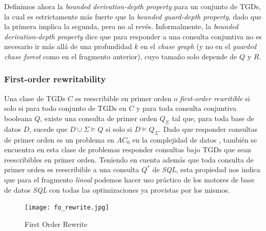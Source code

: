\documentclass[11pt,a4paper,twoside]{tesis}
\begin{document}
Definimos ahora la \textit{bounded derivation-depth property} para un conjunto de TGDs, la cual es estrictamente más fuerte que la \textit{ bounded guard-depth property}, dado que la primera implica la segunda, pero no al revés. Informalmente, la \textit{bounded derivation-depth property} dice que para responder a una consulta conjuntiva no es necesario ir más allá de una profundidad $k$ en el \textit{chase graph} (y no en el \textit{guarded chase forest} como en el fragmento anterior), cuyo tamaño solo depende de $Q$ y $R$.

\subsubsection{First-order rewritability}
Una clase de TGDs $C$ es reescribible en primer orden o \textit{first-order rewritible} si solo si para todo conjunto de TGDs en $C$ y para toda consulta conjuntiva booleana $Q$, existe una consulta de primer orden $Q_\Sigma$ tal que, para toda base de datos $D$, sucede que $D \cup \Sigma \models Q$ si solo si $D \models Q_\Sigma$. Dado que responder consultas de primer orden es un problema en $AC_0$ en la complejidad de datos \cite{Vardi}, también se encuentra en esta clase de problemas responder consultas bajo TGDs que sean reescribibles en primer orden. Teniendo en cuenta además que toda consulta de primer orden es reescribible a una consulta $Q^*$ de \textit{SQL}, esta propiedad nos indica que para el fragmento \textit{lineal} podemos hacer uso práctico de los motores de base de datos \textit{SQL} con todas las optimizaciones ya provistas por los mismos.

\begin{figure}[ht]
    \texttt{[image: fo\_rewrite.jpg]}
    \centering
    \caption{First Order Rewrite}
    \label{fig:fo_rewrite}
\end{figure}
\end{document}
